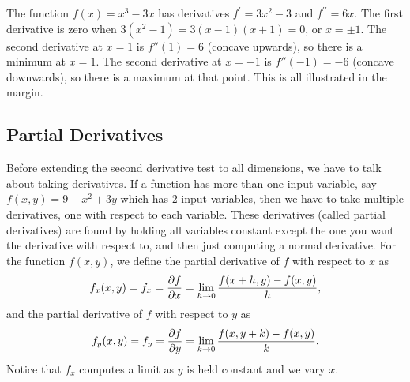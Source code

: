 \begin{example}
The function $f(x) = x^3-3x$ has derivatives $f^\prime = 3x^2-3$ and $f^{\prime\prime}=6x$.  The first derivative is zero when $3(x^2-1)=3(x-1)(x+1)=0$, or $x=\pm 1$.  
The second derivative at $x=1$ is $f''(1)=6$ (concave upwards), so there is a minimum at $x=1$.  
The second derivative at $x=-1$ is $f''(-1)=-6$ (concave downwards),
so there is a maximum at that point. This is all illustrated in the margin.
\end{example}

\subsection{Partial Derivatives}

Before extending the second derivative test to all dimensions, we have to talk about taking derivatives.
If a function has more than one input variable, say $f(x,y)=9-x^2+3y$ which has 2 input variables, then we have to take multiple derivatives, one with respect to each variable.  
These derivatives (called partial derivatives) are found by holding all variables constant except the one you want the derivative with respect to, and then just computing a normal derivative.
For the function $f(x,y)$, we define the partial derivative of $f$ with respect to $x$ as 
$$\displaystyle f_x(x,y)=f_x = \frac{\partial f}{\partial x}= \lim_{h\to 0}\frac{f(x+h,y)-f(x,y)}{h},$$
and the partial derivative of $f$ with respect to $y$ as 
$$\displaystyle f_y(x,y)=f_y =\frac{\partial f}{\partial y}= \lim_{k\to 0}\frac{f(x,y+k)-f(x,y)}{k}.$$
Notice that $f_x$ computes a limit as $y$ is held constant and we vary $x$. 


